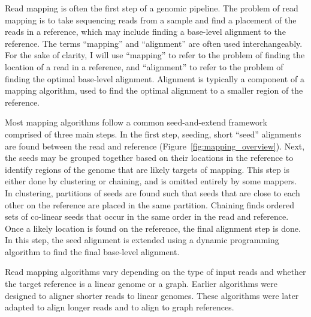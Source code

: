 \documentclass[11pt]{ucscthesis}
\begin{document}
Read mapping is often the first step of a genomic pipeline.
The problem of read mapping is to take sequencing reads from a sample and find a placement of the reads in a reference, which may include finding a base-level alignment to the reference.
The terms ``mapping'' and ``alignment'' are often used interchangeably.
For the sake of clarity, I will use ``mapping'' to refer to the problem of finding the location of a read in a reference, and ``alignment'' to refer to the problem of finding the optimal base-level alignment.
Alignment is typically a component of a mapping algorithm, used to find the optimal alignment to a smaller region of the reference.

Most mapping algorithms follow a common seed-and-extend framework comprised of three main steps.
In the first step, seeding, short ``seed'' alignments are found between the read and reference (Figure~\ref{fig:mapping_overview}).
Next, the seeds may be grouped together based on their locations in the reference to identify regions of the genome that are likely targets of mapping.
This step is either done by clustering or chaining, and is omitted entirely by some mappers.
In clustering, partitions of seeds are found such that seeds that are close to each other on the reference are placed in the same partition.
Chaining finds ordered sets of co-linear seeds that occur in the same order in the read and reference. 
Once a likely location is found on the reference, the final alignment step is done.
In this step, the seed alignment is extended using a dynamic programming algorithm to find the final base-level alignment.

Read mapping algorithms vary depending on the type of input reads and whether the target reference is a linear genome or a graph.
Earlier algorithms were designed to aligner shorter reads to linear genomes.
These algorithms were later adapted to align longer reads and to align to graph references.
\end{document}
